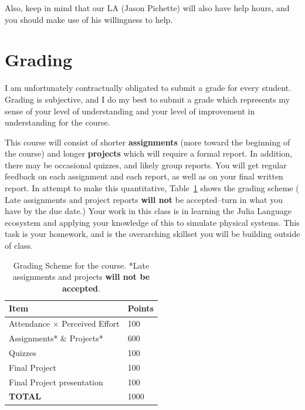\documentclass[justified]{tufte-handout}
\begin{document}
Also, keep in mind that our LA (Jason Pichette)  will also have help hours, and you should make use of his willingness to help. 

\section{Grading}
I am unfortunately contractually obligated to submit a grade for every student. Grading is subjective, and I do my best to submit a grade which represents my sense of your level of understanding and your level of improvement in understanding for the course. 

This course will consist of shorter \textbf{assignments} (more toward the beginning of the course) and longer \textbf{projects} which will require a formal report. In addition, there may be occasional quizzes, and likely group reports. You will get regular feedback on each assignment and each report, as well as on your final written report. In attempt to make this quantitative, Table~\ref{tab:normaltab} shows the grading scheme ( Late assignments and project reports {\bfseries will not} be accepted--turn in what you have by the due date.) Your work in this class is in learning the Julia Language ecosystem and applying your knowledge of this to simulate physical systems. This task is your homework, and is the overarching skillset you will be building outside of class.  \\
\begin{table}[h]
  \centering
  \selectfont
  \begin{tabular}{ll}
    \toprule
    Item &  Points\\
    \midrule
    Attendance $\times$ Perceived Effort & 100 \\
    Assignments* \& Projects* &  600 \\
    Quizzes & 100\\
    Final Project & 100\\
    Final Project presentation & 100\\
    {\bf TOTAL} & 1000 \\
    \bottomrule
  \end{tabular}
  \caption{Grading Scheme for the course. *Late assignments and projects {\bf will not be accepted}.}
  \label{tab:normaltab}
\end{table}

\pagebreak
\end{document}
